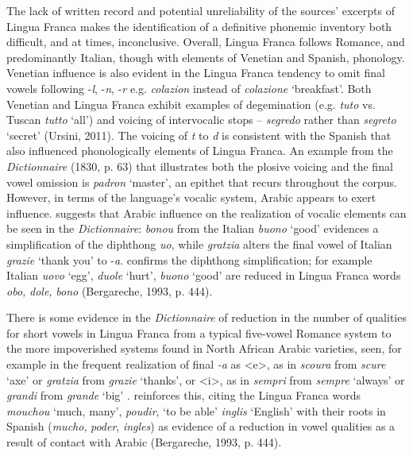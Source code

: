\documentclass[output=paper]{langsci/langscibook}
\begin{document}
The lack of written record and potential unreliability of the sources’ excerpts of Lingua Franca makes the identification of a definitive phonemic inventory both difficult, and at times, inconclusive. Overall, Lingua Franca follows Romance, and predominantly Italian, though with elements of Venetian and Spanish, phonology. Venetian influence is also evident in the Lingua Franca tendency to omit final vowels following -\textit{l}, -\textit{n}, -\textit{r} e.g. \textit{colazion} instead of \textit{colazione} ‘breakfast’. Both Venetian and Lingua Franca exhibit examples of degemination (e.g. \textit{tuto} vs. Tuscan \textit{tutto} ‘all’) and voicing of intervocalic stops – \textit{segredo} rather than \textit{segreto} ‘secret’ (Ursini, 2011). The voicing of \textit{t} to \textit{d} is consistent with the Spanish that also influenced phonologically elements of Lingua Franca. An example from the \textit{Dictionnaire} (1830, p. 63) that illustrates both the plosive voicing and the final vowel omission is \textit{padron} ‘master’, an epithet that recurs throughout the corpus. However, in terms of the language’s vocalic system, Arabic appears to exert influence. \citet{Cifoletti2004} suggests that Arabic influence on the realization of vocalic elements can be seen in the \textit{Dictionnaire}: \textit{bonou} from the Italian \textit{buono} ‘good’ evidences a simplification of the diphthong \textit{uo}, while \textit{gratzia} alters the final vowel of Italian \textit{grazie} ‘thank you’ to -\textit{a}. \citet{Bergareche1993} confirms the diphthong simplification; for example Italian \textit{uovo} ‘egg’, \textit{duole} ‘hurt’, \textit{buono} ‘good’ are reduced in Lingua Franca words \textit{obo,} \textit{dole,} \textit{bono} (Bergareche, 1993, p. 444). 

There is some evidence in the \textit{Dictionnaire}  of reduction in the number of qualities for short vowels in Lingua Franca from a typical five-vowel Romance system to the more impoverished systems found in North African Arabic varieties, seen, for example in the frequent realization of final \-\textit{{}-a} as <e>, as in \textit{scoura} from \textit{scure} ‘axe’ or \textit{gratzia} from \textit{grazie} ‘thanks’, or <i>, as in \textit{sempri} from \textit{sempre} ‘always’ or \textit{grandi} from \textit{grande} ‘big’ . \citet{Bergareche1993} reinforces this, citing the Lingua Franca words \textit{mouchou} ‘much, many’, \textit{poudir}, ‘to be able’ \textit{inglis} ‘English’ with their roots in Spanish (\textit{mucho}, \textit{poder}, \textit{ingles}) as evidence of a reduction in vowel qualities as a result of contact with Arabic (Bergareche, 1993, p. 444). 
\end{document}
